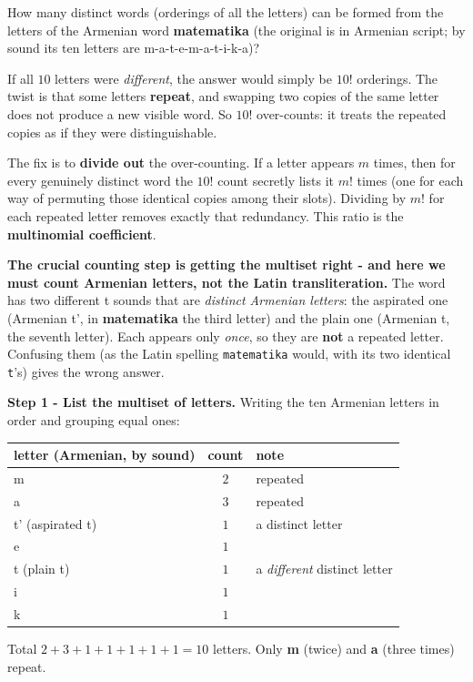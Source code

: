 \documentclass[11pt,a4paper]{article}
\begin{document}
\begin{problembox}[11]
How many distinct \textquotedbl{}words\textquotedbl{} (orderings of all the letters) can be formed
from the letters of the Armenian word \textbf{matematika} (the original is in Armenian script; by
sound its ten letters are m-a-t-e-m-a-t-i-k-a)?
\end{problembox}

\begin{ideabox}
If all $10$ letters were \emph{different}, the answer would simply be $10!$ orderings. The twist is
that some letters \textbf{repeat}, and swapping two copies of the same letter does not produce a new
visible word. So $10!$ over-counts: it treats the repeated copies as if they were distinguishable.

The fix is to \textbf{divide out} the over-counting. If a letter appears $m$ times, then for every
genuinely distinct word the $10!$ count secretly lists it $m!$ times (one for each way of permuting
those identical copies among their slots). Dividing by $m!$ for each repeated letter removes exactly
that redundancy. This ratio is the \textbf{multinomial coefficient}.

\textbf{The crucial counting step is getting the multiset right - and here we must count Armenian
letters, not the Latin transliteration.} The word has two different \textquotedbl{}t\textquotedbl{}
sounds that are \emph{distinct Armenian letters}: the aspirated one (Armenian
\textquotedbl{}t'\textquotedbl{}, in \textbf{matematika} the third letter) and the plain one
(Armenian \textquotedbl{}t\textquotedbl{}, the seventh letter). Each appears only \emph{once}, so
they are \textbf{not} a repeated letter. Confusing them (as the Latin spelling \texttt{matematika}
would, with its two identical \texttt{t}'s) gives the wrong answer.
\end{ideabox}

\textbf{Step 1 - List the multiset of letters.}
Writing the ten Armenian letters in order and grouping equal ones:
\begin{center}
\small
\begin{tabular}{@{}lcl@{}}
\toprule
letter (Armenian, by sound) & count & note\\
\midrule
m  & $2$ & repeated\\
a  & $3$ & repeated\\
t' (aspirated t) & $1$ & a distinct letter\\
e  & $1$ &\\
t  (plain t) & $1$ & a \emph{different} distinct letter\\
i  & $1$ &\\
k  & $1$ &\\
\bottomrule
\end{tabular}
\end{center}
Total $2+3+1+1+1+1+1=10$ letters. Only \textbf{m} (twice) and \textbf{a} (three times) repeat.
\end{document}
